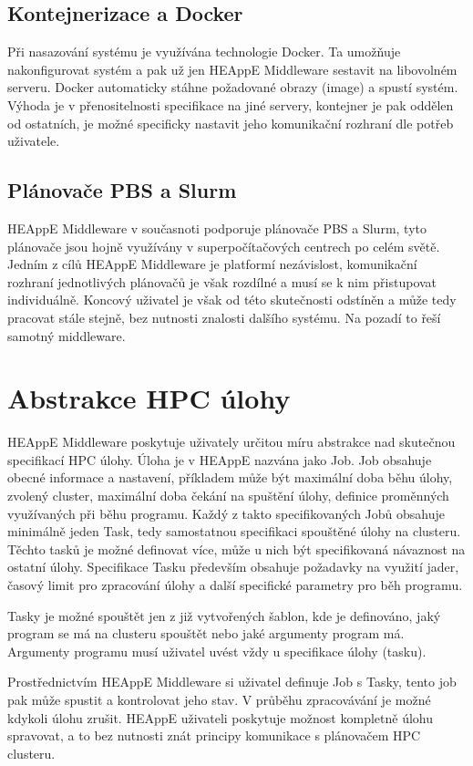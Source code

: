 \subsection{Kontejnerizace a Docker}
Při nasazování systému je využívána technologie Docker. Ta umožňuje nakonfigurovat systém a pak už jen HEAppE Middleware sestavit na libovolném serveru. Docker automaticky stáhne požadované obrazy (image) a spustí systém. Výhoda je v přenositelnosti specifikace na jiné servery, kontejner je pak oddělen od ostatních, je možné specificky nastavit jeho komunikační rozhraní dle potřeb uživatele.

\subsection{Plánovače PBS a Slurm}
HEAppE Middleware v současnoti podporuje plánovače PBS a Slurm, tyto plánovače jsou hojně využívány v superpočítačových centrech po celém světě. Jedním z cílů HEAppE Middleware je platformí nezávislost, komunikační rozhraní jednotlivých plánovačů je však rozdílné a musí se k nim přistupovat individuálně. Koncový uživatel je však od této skutečnosti odstíněn a může tedy pracovat stále stejně, bez nutnosti znalosti dalšího systému. Na pozadí to řeší samotný middleware.


\section{Abstrakce HPC úlohy}
HEAppE Middleware poskytuje uživately určitou míru abstrakce nad skutečnou specifikací HPC úlohy. Úloha je v HEAppE nazvána jako Job. Job obsahuje obecné informace a nastavení, příkladem může být maximální doba běhu úlohy, zvolený cluster, maximální doba čekání na spuštění úlohy, definice proměnných využívaných při běhu programu. Každý z takto specifikovaných Jobů obsahuje minimálně jeden Task, tedy samostatnou specifikaci spouštěné úlohy na clusteru. Těchto tasků je možné definovat více, může u nich být specifikovaná návaznost na ostatní úlohy. Specifikace Tasku především obsahuje požadavky na využití jader, časový limit pro zpracování úlohy a další specifické parametry pro běh programu.

Tasky je možné spouštět jen z již vytvořených šablon, kde je definováno, jaký program se má na clusteru spouštět nebo jaké argumenty program má. Argumenty programu musí uživatel uvést vždy u specifikace úlohy (tasku).

Prostřednictvím HEAppE Middleware si uživatel definuje Job s Tasky, tento job pak může spustit a kontrolovat jeho stav. V průběhu zpracovávání je možné kdykoli úlohu zrušit. HEAppE uživateli poskytuje možnost kompletně úlohu spravovat, a to bez nutnosti znát principy komunikace s plánovačem HPC clusteru.


